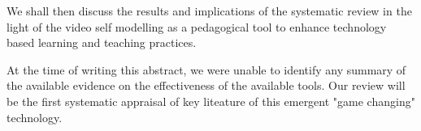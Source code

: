 We shall then discuss the results and implications of the systematic review in the light of the video self modelling as a pedagogical tool to enhance technology based learning and teaching practices. 

At the time of writing this abstract, we were unable to identify any summary of the available evidence on the effectiveness of the available tools. Our review will be the first systematic appraisal of key liteature of this emergent "game changing" technology. 